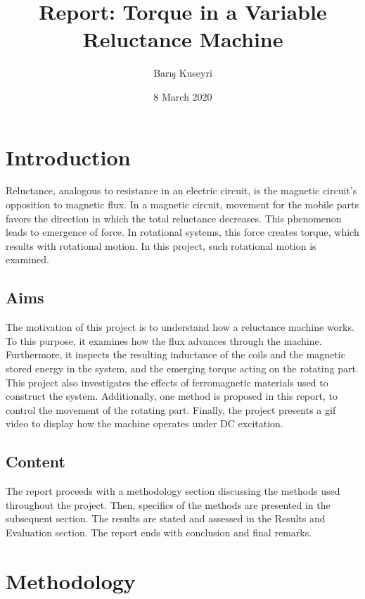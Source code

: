 \documentclass[a4paper, 11pt]{article}
\begin{document}
\title{Report: Torque in a Variable Reluctance Machine}
\author{Barış Kuseyri}
\date{8 March 2020}
\maketitle

\tableofcontents
\newpage

\section{Introduction}


Reluctance, analogous to resistance in an electric circuit, is the magnetic circuit's opposition to magnetic flux. In a magnetic circuit, movement for the mobile parts favors the direction in which the total reluctance decreases. This phenomenon leads to emergence of force. In rotational systems, this force creates torque, which results with rotational motion. In this project, such rotational motion is examined.

\subsection{Aims}

The motivation of this project is to understand how a reluctance machine works. To this purpose, it examines how the flux advances through the machine. Furthermore, it inspects the resulting inductance of the coils and the magnetic stored energy in the system, and the emerging torque acting on the rotating part. This project also investigates the effects of ferromagnetic materials used to construct the system. Additionally, one method is proposed in this report, to control the movement of the rotating part. Finally, the project presents a gif video to display how the machine operates under DC excitation.

\subsection{Content}

The report proceeds with a methodology section discussing the methods used throughout the project. Then, specifics of the methods are presented in the subsequent section. The results are stated and assessed in the Results and Evaluation section. The report ends with conclusion and final remarks.

\section{Methodology}
\end{document}
